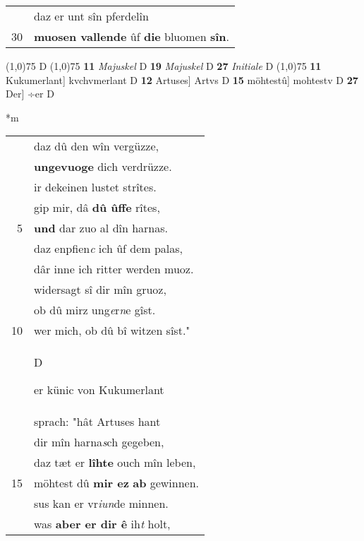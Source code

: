 \documentclass[8pt,a4paper,notitlepage]{article}
\begin{document}
\begin{table}[ht]
\begin{minipage}[t]{0.5\linewidth}
\begin{tabular}{rl}
 & daz er unt sîn pferdelîn\\ 
30 & \textbf{muosen vallende} ûf \textbf{die} bluomen \textbf{sîn}.\\ 
\end{tabular}
\scriptsize
\line(1,0){75} \newline
D \newline
\line(1,0){75} \newline
\textbf{11} \textit{Majuskel} D  \textbf{19} \textit{Majuskel} D  \textbf{27} \textit{Initiale} D  \newline
\line(1,0){75} \newline
\textbf{11} Kukumerlant] kvchvmerlant D \textbf{12} Artuses] Artvs D \textbf{15} möhtestû] mohtestv D \textbf{27} Der] ÷er D \newline
\end{minipage}
\hspace{0.5cm}
\begin{minipage}[t]{0.5\linewidth}
\small
\begin{center}*m
\end{center}
\begin{tabular}{rl}
 & daz dû den wîn vergüzze,\\ 
 & \textbf{ungevuoge} dich verdrüzze.\\ 
 & ir dekeinen lustet strîtes.\\ 
 & gip mir, dâ \textbf{dû ûffe} rîtes,\\ 
5 & \textbf{und} dar zuo al dîn harnas.\\ 
 & daz enpfien\textit{c} ich ûf dem palas,\\ 
 & dâr inne ich ritter werden muoz.\\ 
 & widersagt sî dir mîn gruoz,\\ 
 & ob dû mirz ung\textit{e}r\textit{n}e gîst.\\ 
10 & wer mich, ob dû bî witzen sîst."\\ 
 & \begin{large}D\end{large}er künic von Kukumerlant\\ 
 & sprach: "hât Artuses hant\\ 
 & dir mîn harna\textit{s}ch gegeben,\\ 
 & daz tæt er \textbf{lîhte} ouch mîn leben,\\ 
15 & möhtest dû \textbf{mir ez} \textbf{ab} gewinnen.\\ 
 & sus kan er vr\textit{iun}de minnen.\\ 
 & was \textbf{aber er dir ê} ih\textit{t} holt,\\ 

\end{tabular}
\end{minipage}
\end{table}
\end{document}
